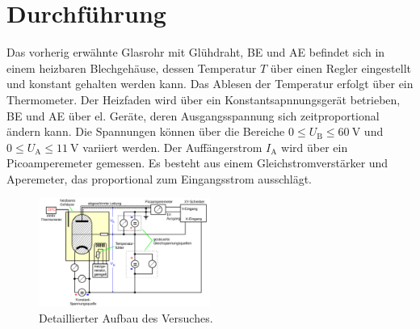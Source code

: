 \section{Durchführung}
\label{sec:Durchfuehrung}
Das vorherig erwähnte Glasrohr mit Glühdraht, BE und AE befindet sich in einem heizbaren Blechgehäuse, dessen Temperatur $T$ über einen Regler eingestellt und konstant gehalten werden kann.
Das Ablesen der Temperatur erfolgt über ein Thermometer.
Der Heizfaden wird über ein Konstantsapnnungsgerät betrieben, BE und AE über el. Geräte, deren Ausgangsspannung sich zeitproportional ändern kann. 
Die Spannungen können über die Bereiche $0\leq U_\mathup{B} \leq \SI{60}{\volt}$ und $0\leq U_\mathup{A}\leq \SI{11}{\volt}$ variiert werden. Der Auffängerstrom $I_\mathup{A}$ wird über ein Picoamperemeter gemessen.
 Es besteht aus einem Gleichstromverstärker und Aperemeter, das proportional zum Eingangsstrom ausschlägt. 

\begin{figure}
	\includegraphics[width=0.5\textwidth]{Bilder/Aufbau_Detail.pdf}
	\caption{Detaillierter Aufbau des Versuches.}
\end{figure}

